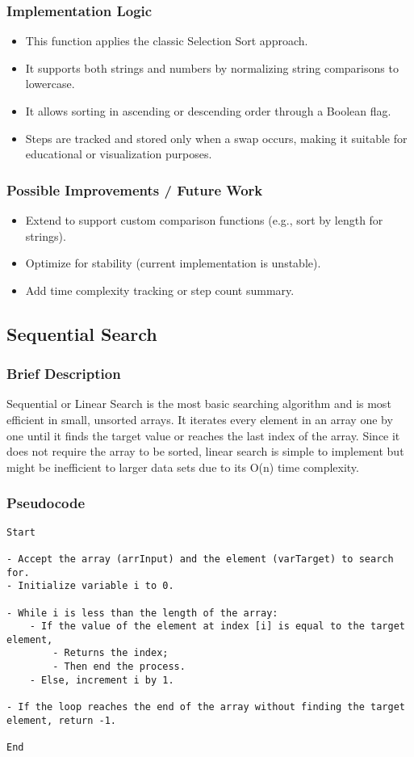 \documentclass{article}
\begin{document}
\subsubsection*{Implementation Logic}
\begin{itemize}
    \item This function applies the classic Selection Sort approach.
    \item It supports both strings and numbers by normalizing string comparisons to lowercase.
    \item It allows sorting in ascending or descending order through a Boolean flag.
    \item Steps are tracked and stored only when a swap occurs, making it suitable for educational or visualization purposes.
\end{itemize}
\subsubsection*{Possible Improvements / Future Work}
\begin{itemize}
    \item Extend to support custom comparison functions (e.g., sort by length for strings).
    \item Optimize for stability (current implementation is unstable).
    \item Add time complexity tracking or step count summary.
\end{itemize}



\subsection{Sequential Search}
\subsubsection*{Brief Description}
Sequential or Linear Search is the most basic searching algorithm and is most efficient in small, unsorted arrays. It iterates every element in an array one by one until it finds the target value or reaches the last index of the array. Since it does not require the array to be sorted, linear search is simple to implement but might be inefficient to larger data sets due to its O(n) time complexity.
\subsubsection*{Pseudocode}
\begin{lstlisting}
Start

- Accept the array (arrInput) and the element (varTarget) to search for.
- Initialize variable i to 0.

- While i is less than the length of the array:
    - If the value of the element at index [i] is equal to the target element,
        - Returns the index;
        - Then end the process.
    - Else, increment i by 1.

- If the loop reaches the end of the array without finding the target element, return -1.

End
\end{lstlisting}
\end{document}
